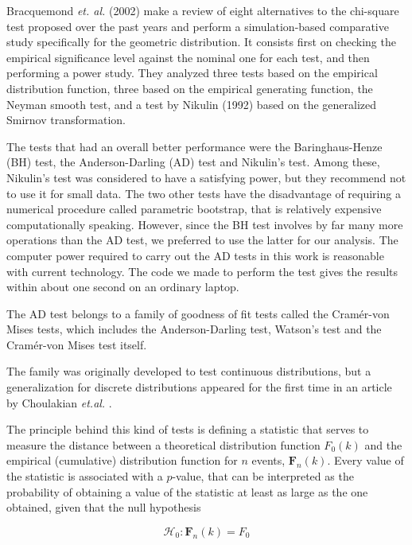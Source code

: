 \documentclass[a4paper]{jpconf}
\begin{document}
\begin{appendices}
Bracquemond {\it et. al.} (2002) \cite{BraCreGau} make a review of eight alternatives to the chi-square test proposed over the past years and perform a simulation-based comparative study specifically for the geometric distribution. It consists first on checking the empirical significance level against the nominal one for each test, and then performing a power study. They analyzed three tests based on the empirical distribution function, three based on the empirical generating function, the Neyman smooth test, and a test by Nikulin (1992) \cite{Nikulin} based on the generalized Smirnov transformation.
 
The tests that had an overall better performance were the Baringhaus-Henze (BH) test, the Anderson-Darling (AD) test and Nikulin's test. Among these, Nikulin's test was considered to have a satisfying power, but they recommend not to use it for small data. The two other tests have the disadvantage of requiring a numerical procedure called parametric bootstrap, that is relatively expensive computationally speaking. However, since the BH test involves by far many more operations than the AD test, we preferred to use the latter for our analysis. The computer power required to carry out the AD tests in this work is reasonable with current technology. The code we made to perform the test gives the results within about one second on an ordinary laptop.

The AD test belongs to a family of goodness of fit tests called the Cram\'{e}r-von Mises tests, which includes the Anderson-Darling test, Watson's test and the Cram\'{e}r-von Mises test itself.
 
The family was originally developed to test continuous distributions, but a generalization for discrete distributions appeared for the first time in an article by Choulakian {\it et.al.} \cite{Choulakian}. 

The principle behind this kind of tests is defining a statistic that serves to measure the distance between a theoretical distribution function $F_0(k)$ and the empirical (cumulative) distribution function for $n$ events, $\mathbf{F}_n(k)$. Every value of the statistic is associated with a $p$-value, that can be interpreted as the probability of obtaining a value of the statistic at least as large as the one obtained, given that the null hypothesis

\begin{equation} 
\label{eq_null_hypothesis}
\mathcal{H}_0: \mathbf{F}_n(k) = F_0
\end{equation}


\end{appendices}
\end{document}
